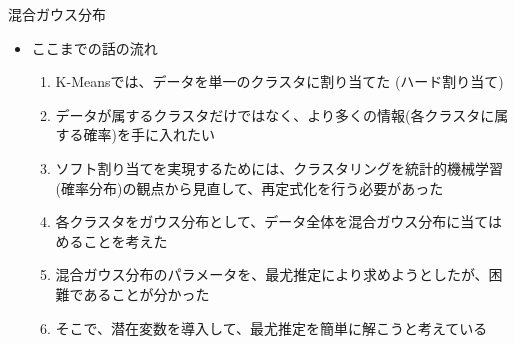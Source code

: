 \documentclass[dvipdfmx,notheorems,t]{beamer}
\begin{document}
\begin{frame}{混合ガウス分布}

\begin{itemize}
	\item ここまでの話の流れ
	\begin{enumerate}
		\item K-Meansでは、データを単一のクラスタに割り当てた (\alert{ハード割り当て})
		\newline
		\item データが属するクラスタだけではなく、より多くの情報(各クラスタに属する確率)を手に入れたい
		\newline
		\item \alert{ソフト割り当て}を実現するためには、クラスタリングを統計的機械学習(確率分布)の観点から見直して、再定式化を行う必要があった
		\newline
		\item 各クラスタをガウス分布として、データ全体を\alert{混合ガウス分布}に当てはめることを考えた
		\newline
		\item 混合ガウス分布のパラメータを、最尤推定により求めようとしたが、困難であることが分かった
		\newline
		\item そこで、\alert{潜在変数}を導入して、最尤推定を簡単に解こうと考えている
	\end{enumerate}
\end{itemize}

\end{frame}
\end{document}
